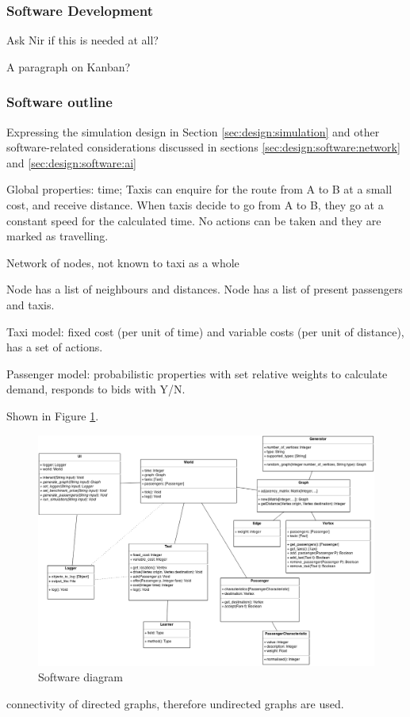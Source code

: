 \subsubsection{Software Development}
Ask Nir if this is needed at all?

A paragraph on Kanban? \parencite{Anderson2010kanban}


\subsubsection{Software outline}
\label{sec:design:software}

Expressing the simulation design in Section \ref{sec:design:simulation} and
other software-related considerations discussed in sections
\ref{sec:design:software:network} and \ref{sec:design:software:ai}

Global properties: time; Taxis
can enquire for the route from A to B at a small cost, and receive distance.
When taxis decide to go from A to B, they go at a constant speed for the
calculated time. No actions can be taken and they are marked as travelling.

Network of nodes, not known to taxi as a whole

Node has a list of neighbours and distances.
Node has a list of present passengers and taxis.

Taxi model: fixed cost (per unit of time) and variable costs (per unit of
distance), has a set of actions.

Passenger model: probabilistic properties with set relative weights to
calculate demand, responds to bids with Y/N.

Shown in Figure \ref{figure:design:software}.

\begin{figure}
  \begin{center}
    \includegraphics[width=\textwidth]{../figures/software_diagram}
    \caption{
      Software diagram
      \label{figure:design:software}
    }
  \end{center}
\end{figure}

connectivity of directed graphs, therefore undirected graphs are
used.

